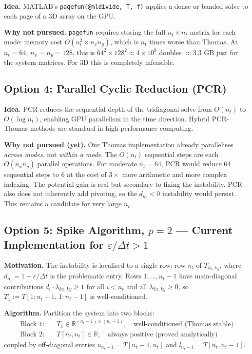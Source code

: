 \documentclass[11pt]{article}
\newcommand{\eps}{\varepsilon}
\newcommand{\dt}{\Delta t}
\newcommand{\RR}{\mathbb{R}}
\newcommand{\lxy}{\lambda_{kx,ky}}
\begin{document}
\textbf{Idea.}
MATLAB's \texttt{pagefun(@mldivide, T, f)} applies a dense or banded solve to each
page of a 3D array on the GPU.

\textbf{Why not pursued.}
\texttt{pagefun} requires storing the full $n_t \times n_t$ matrix for each mode:
memory cost $O(n_t^2 \times n_x n_y)$, which is $n_t$ times worse than Thomas.
At $n_t = 64$, $n_x = n_y = 128$, this is $64^2 \times 128^2 \approx 4 \times 10^8$
doubles $\approx 3.3$ GB just for the system matrices.
For 3D this is completely infeasible.

\subsection{Option 4: Parallel Cyclic Reduction (PCR)}

\textbf{Idea.}
PCR reduces the sequential depth of the tridiagonal solve from $O(n_t)$ to $O(\log n_t)$,
enabling GPU parallelism in the time direction.
Hybrid PCR-Thomas methods are standard in high-performance computing.

\textbf{Why not pursued (yet).}
Our Thomas implementation already parallelises \textit{across modes}, not \textit{within a mode}.
The $O(n_t)$ sequential steps are each $O(n_x n_y)$ parallel operations.
For moderate $n_t = 64$, PCR would reduce 64 sequential steps to 6 at the cost of
$3\times$ more arithmetic and more complex indexing.
The potential gain is real but secondary to fixing the instability.
PCR also does not inherently add pivoting, so the $d_{n_t} < 0$ instability would persist.
This remains a candidate for very large $n_t$.

\subsection{Option 5: Spike Algorithm, $p = 2$ --- Current Implementation for $\eps/\dt > 1$}

\textbf{Motivation.}
The instability is localised to a single row: row $n_t$ of $T_{k_x,k_y}$, where
$d_{n_t} = 1 - \eps/\dt$ is the problematic entry.
Rows $1, \ldots, n_t - 1$ have main-diagonal contributions $d_i \cdot \lxy \geq 1$
for all $i < n_t$ and all $\lxy \geq 0$, so $T_1 := T[1:n_t-1,\, 1:n_t-1]$
is well-conditioned.

\textbf{Algorithm.}
Partition the system into two blocks:
\begin{align}
  \text{Block 1:} \quad & T_1 \in \RR^{(n_t-1)\times(n_t-1)}, \quad \text{well-conditioned (Thomas stable)} \\
  \text{Block 2:} \quad & T[n_t, n_t] \in \RR, \quad \text{always positive (proved analytically)}
\end{align}
coupled by off-diagonal entries $u_{n_t-1} = T[n_t-1, n_t]$ and $l_{n_t-1} = T[n_t, n_t-1]$.
\end{document}
